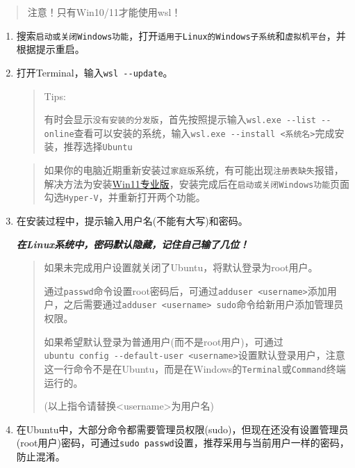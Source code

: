 \documentclass{article}
\begin{document}
\begin{quote}
  注意！只有Win10/11才能使用wsl！
\end{quote}

\begin{enumerate}
  \def\labelenumi{\arabic{enumi}.}
  \item
        搜索\texttt{启动或关闭Windows功能}，打开\texttt{适用于Linux的Windows子系统}和\texttt{虚拟机平台}，并根据提示重启。
  \item
        打开Terminal，输入\texttt{wsl\ -\/-update}。

        \begin{quote}
          Tips:

          有时会显示\texttt{没有安装的分发版}，首先按照提示输入\texttt{wsl.exe\ -\/-list\ -\/-online}查看可以安装的系统，输入\texttt{wsl.exe\ -\/-install\ \textless{}系统名\textgreater{}}完成安装，推荐选择\texttt{Ubuntu}
        \end{quote}

        \begin{quote}
          如果你的电脑近期重新安装过\texttt{家庭版}系统，有可能出现\texttt{注册表缺失}报错，解决方法为安装\href{https://software.seu.edu.cn/soft/detail/18}{Win11专业版}，安装完成后在\texttt{启动或关闭Windows功能}页面勾选\texttt{Hyper-V}，并重新打开两个功能。
        \end{quote}
  \item
        在安装过程中，提示输入用户名(不能有大写)和密码。

        \emph{\textbf{在Linux系统中，密码默认隐藏，记住自己输了几位！}}

        \begin{quote}
          如果未完成用户设置就关闭了Ubuntu，将默认登录为root用户。

          通过\texttt{passwd}命令设置root密码后，可通过\texttt{adduser\ \textless{}username\textgreater{}}添加用户，之后需要通过\texttt{adduser\ \textless{}username\textgreater{}\ sudo}命令给新用户添加管理员权限。

          如果希望默认登录为普通用户(而不是root用户)，可通过\texttt{ubuntu\ config\ -\/-default-user\ \textless{}username\textgreater{}}设置默认登录用户，注意这一行命令不是在Ubuntu，而是在Windows的\texttt{Terminal}或\texttt{Command}终端运行的。

          (以上指令请替换\textless{}username\textgreater 为用户名)
        \end{quote}
  \item
        在Ubuntu中，大部分命令都需要管理员权限(sudo)，但现在还没有设置管理员(root用户)密码，可通过\texttt{sudo\ passwd}设置，推荐采用与当前用户一样的密码，防止混淆。
\end{enumerate}
\end{document}
